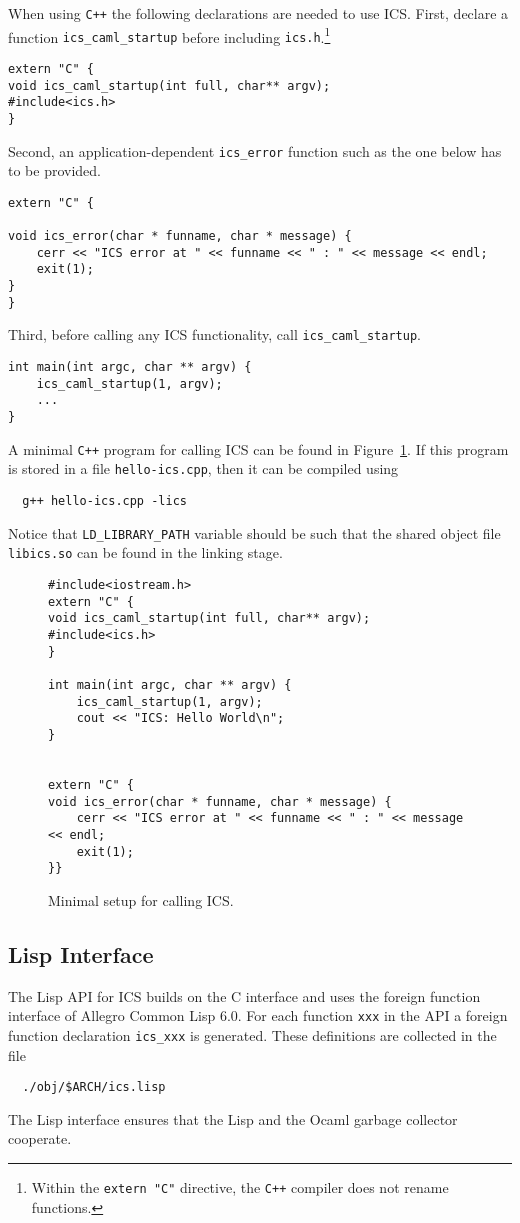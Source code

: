 \documentclass[12pt]{article}
\begin{document}
When using {\tt C++} the following declarations are needed to
use ICS.  First, declare a function {\tt ics\_caml\_startup} before
including {\tt ics.h}.\footnote{Within the {\tt extern "C"} directive,
the {\tt C++} compiler does not rename functions.}
\begin{verbatim}
extern "C" {
void ics_caml_startup(int full, char** argv);
#include<ics.h>
}
\end{verbatim}
Second, an application-dependent {\tt ics\_error} function
such as the one below has to be provided.
\begin{verbatim}
extern "C" {

void ics_error(char * funname, char * message) {
    cerr << "ICS error at " << funname << " : " << message << endl;
    exit(1);
}
}
\end{verbatim}
Third, before calling any ICS functionality, call {\tt ics\_caml\_startup}.
\begin{verbatim}
int main(int argc, char ** argv) {
    ics_caml_startup(1, argv);
    ...
}
\end{verbatim}
A minimal {\tt C++} program for calling ICS can be found in 
Figure~\ref{fig:hello-ics}. If this program is stored in a file
{\tt hello-ics.cpp}, then it can be compiled using
  \begin{verbatim} 
  g++ hello-ics.cpp -lics
  \end{verbatim}
Notice that {\tt LD\_LIBRARY\_PATH} variable should be such that
the shared object file {\tt libics.so} can be found in the linking
stage.

\begin{figure}[t]
\begin{verbatim}
#include<iostream.h>
extern "C" {
void ics_caml_startup(int full, char** argv);
#include<ics.h>
}

int main(int argc, char ** argv) {
    ics_caml_startup(1, argv);
    cout << "ICS: Hello World\n";
}


extern "C" {
void ics_error(char * funname, char * message) {
    cerr << "ICS error at " << funname << " : " << message << endl;
    exit(1);
}}
\end{verbatim}
\caption{Minimal setup for calling ICS.\label{fig:hello-ics}}
\end{figure}


\subsection{Lisp Interface}

The Lisp API for ICS builds on the C interface and uses the foreign
function interface of Allegro Common Lisp 6.0.  For each function
\texttt{xxx} in the API a foreign function declaration \texttt{ics\_xxx}
is generated.  These definitions are collected in the file
 \begin{verbatim}
  ./obj/$ARCH/ics.lisp
  \end{verbatim}
The Lisp interface ensures that the Lisp and the Ocaml garbage collector
cooperate.
\end{document}
